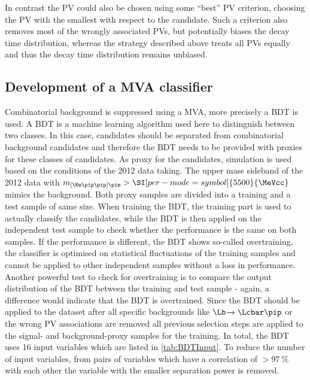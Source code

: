 In contrast the \ac{PV} could also be chosen using some \enquote{best} \ac{PV} criterion, \eg choosing the \ac{PV} with the smallest \chisqip with respect to the \Bz candidate.
Such a criterion also removes most of the wrongly associated \ac{PV}s, but potentially biases the decay time distribution, whereas the strategy described above treats all \ac{PV}s equally and thus the decay time distribution remains unbiased.

\subsection{Development of a MVA classifier}
\label{sec:MVADev}

Combinatorial background is suppressed using a \ac{MVA}, more precisely a \ac{BDT} is used.
A \ac{BDT} is a machine learning algorithm used here to distinguish between two classes.
In this case, \BdToDpi candidates should be separated from combinatorial background candidates and therefore the BDT needs to be provided with proxies for these classes of candidates.
As proxy for the \BdToDpi candidates, simulation is used based on the conditions of the \num{2012} data taking.
The upper mass sideband of the \num{2012} data with $m_{\left[\Km\pip\pip\right]\pim}>\SI[per-mode=symbol]{5500}{\MeVcc}$ mimics the background.
Both proxy samples are divided into a training and a test sample of same size.
When training the \ac{BDT}, the training part is used to actually classify the candidates, while the \ac{BDT} is then applied on the independent test sample to check whether the performance is the same on both samples.
If the performance is different, the \ac{BDT} shows so-called overtraining, \ie the classifier is optimised on statistical fluctuations of the training samples and cannot be applied to other independent samples without a loss in performance.
Another powerful test to check for overtraining is to compare the output distribution of the \ac{BDT} between the training and test sample - again, a difference would indicate that the \ac{BDT} is overtrained.
Since the \ac{BDT} should be applied to the dataset after all specific backgrounds like $\Lb\!\to\Lcbar\pip$ or the wrong PV associations are removed  all previous selection steps are applied to the signal- and background-proxy samples for the training.
In total, the \ac{BDT} uses \num{16} input variables which are listed in \cref{tab:BDTInput}.
To reduce the number of input variables, from pairs of variables which have a correlation of $>\SI{97}{\percent}$ with each other the variable with the smaller separation power is removed.

